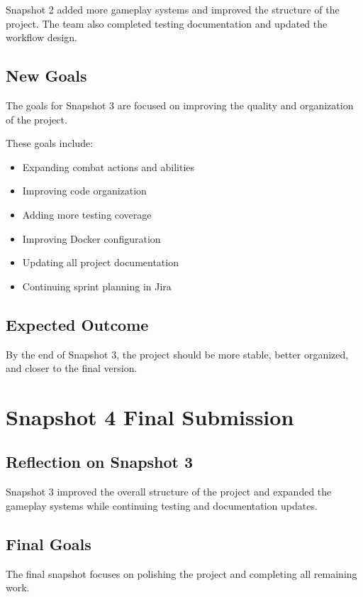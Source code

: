 \documentclass{article}
\begin{document}
Snapshot 2 added more gameplay systems and improved the structure
of the project. The team also completed testing documentation
and updated the workflow design.

\subsection{New Goals}

The goals for Snapshot 3 are focused on improving the quality
and organization of the project.

These goals include:

\begin{itemize}
\item Expanding combat actions and abilities
\item Improving code organization
\item Adding more testing coverage
\item Improving Docker configuration
\item Updating all project documentation
\item Continuing sprint planning in Jira
\end{itemize}

\subsection{Expected Outcome}

By the end of Snapshot 3, the project should be more stable,
better organized, and closer to the final version.

\section{Snapshot 4 Final Submission}

\subsection{Reflection on Snapshot 3}

Snapshot 3 improved the overall structure of the project
and expanded the gameplay systems while continuing testing
and documentation updates.

\subsection{Final Goals}

The final snapshot focuses on polishing the project
and completing all remaining work.
\end{document}
